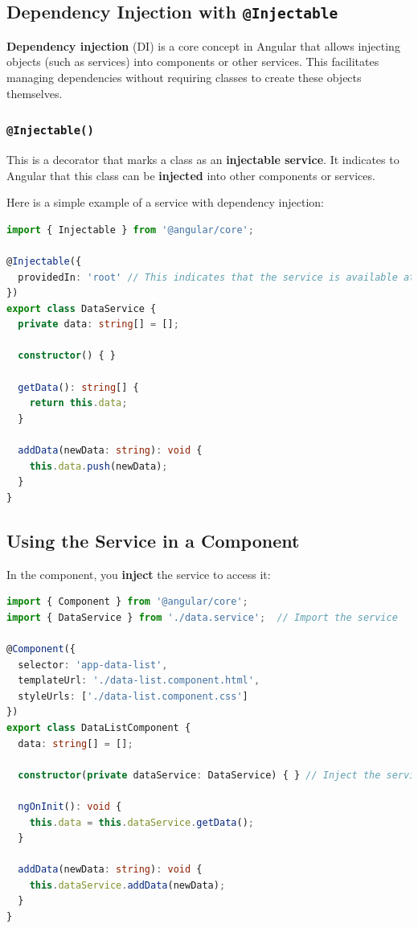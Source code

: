\documentclass{article}
\begin{document}
\subsection{Dependency Injection with \texttt{@Injectable}}

\textbf{Dependency injection} (DI) is a core concept in Angular that allows injecting objects (such as services) into components or other services. This facilitates managing dependencies without requiring classes to create these objects themselves.

\subsubsection{\texttt{@Injectable()}}

This is a decorator that marks a class as an \textbf{injectable service}. It indicates to Angular that this class can be \textbf{injected} into other components or services.

Here is a simple example of a service with dependency injection:

\begin{lstlisting}[language=TypeScript, caption={TypeScript service example}, label={lst:typescript-service}]
import { Injectable } from '@angular/core';

@Injectable({
  providedIn: 'root' // This indicates that the service is available at the application level
})
export class DataService {
  private data: string[] = [];

  constructor() { }

  getData(): string[] {
    return this.data;
  }

  addData(newData: string): void {
    this.data.push(newData);
  }
}
\end{lstlisting}

\subsection{Using the Service in a Component}

In the component, you \textbf{inject} the service to access it:

\begin{lstlisting}[language=TypeScript, caption={Using a service in a component}, label={lst:typescript-service-usage}]
import { Component } from '@angular/core';
import { DataService } from './data.service';  // Import the service

@Component({
  selector: 'app-data-list',
  templateUrl: './data-list.component.html',
  styleUrls: ['./data-list.component.css']
})
export class DataListComponent {
  data: string[] = [];

  constructor(private dataService: DataService) { } // Inject the service

  ngOnInit(): void {
    this.data = this.dataService.getData();
  }

  addData(newData: string): void {
    this.dataService.addData(newData);
  }
}
\end{lstlisting}
\end{document}
